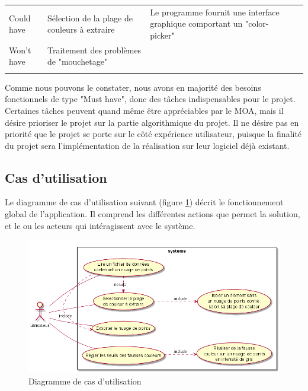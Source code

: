 \documentclass[12pt,titlepage,french]{article}
\begin{document}
\noindent\begin{tabu} to \toprule
     &&&\\\toprule
Could have
& Sélection de la plage de couleurs à extraire 
& Le programme fournit une interface graphique comportant un "color-picker"
& \\\midrule
Won't have
& Traitement des problèmes de "mouchetage"
& 
&\\\bottomrule \\
\end{tabu}

Comme nous pouvons le constater, nous avons en majorité des besoins fonctionnels de type "Must have", donc des tâches indispensables pour le projet. Certaines tâches peuvent quand même être appréciables par le MOA, mais il désire prioriser le projet sur la partie algorithmique du projet. Il ne désire pas en priorité que le projet se porte sur le côté expérience utilisateur, puisque la finalité du projet sera l'implémentation de la réalisation sur leur logiciel déjà existant.

\subsection*{Cas d'utilisation}

Le diagramme de cas d'utilisation suivant (figure \ref{Diagramme de cas d'utilisation}) décrit le fonctionnement global de l'application.
Il comprend les différentes actions que permet la solution, et le ou les acteurs qui intéragissent avec le système.

\begin{figure} [!hbtp]
 \centering
    \caption{Diagramme de cas d'utilisation}
    \label{Diagramme de cas d'utilisation}
    \includegraphics[scale=0.6]{use_cases.png}
\end{figure}
\end{document}
